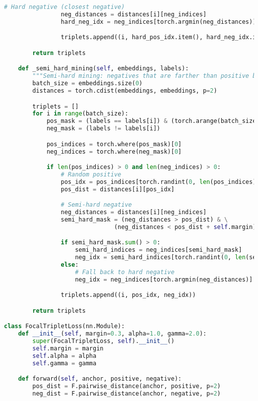 \begin{lstlisting}[language=Python, caption=Advanced Triplet Mining Implementation]
                # Hard negative (closest negative)
                neg_distances = distances[i][neg_indices]
                hard_neg_idx = neg_indices[torch.argmin(neg_distances)]

                triplets.append((i, hard_pos_idx.item(), hard_neg_idx.item()))

        return triplets

    def _semi_hard_mining(self, embeddings, labels):
        """Semi-hard mining: negatives that are farther than positive but within margin"""
        batch_size = embeddings.size(0)
        distances = torch.cdist(embeddings, embeddings, p=2)

        triplets = []
        for i in range(batch_size):
            pos_mask = (labels == labels[i]) & (torch.arange(batch_size) != i)
            neg_mask = (labels != labels[i])

            pos_indices = torch.where(pos_mask)[0]
            neg_indices = torch.where(neg_mask)[0]

            if len(pos_indices) > 0 and len(neg_indices) > 0:
                # Random positive
                pos_idx = pos_indices[torch.randint(0, len(pos_indices), (1,))].item()
                pos_dist = distances[i][pos_idx]

                # Semi-hard negative
                neg_distances = distances[i][neg_indices]
                semi_hard_mask = (neg_distances > pos_dist) & \
                               (neg_distances < pos_dist + self.margin)

                if semi_hard_mask.sum() > 0:
                    semi_hard_indices = neg_indices[semi_hard_mask]
                    neg_idx = semi_hard_indices[torch.randint(0, len(semi_hard_indices), (1,))].item()
                else:
                    # Fall back to hard negative
                    neg_idx = neg_indices[torch.argmin(neg_distances)].item()

                triplets.append((i, pos_idx, neg_idx))

        return triplets

class FocalTripletLoss(nn.Module):
    def __init__(self, margin=0.3, alpha=1.0, gamma=2.0):
        super(FocalTripletLoss, self).__init__()
        self.margin = margin
        self.alpha = alpha
        self.gamma = gamma

    def forward(self, anchor, positive, negative):
        pos_dist = F.pairwise_distance(anchor, positive, p=2)
        neg_dist = F.pairwise_distance(anchor, negative, p=2)


\end{lstlisting}
